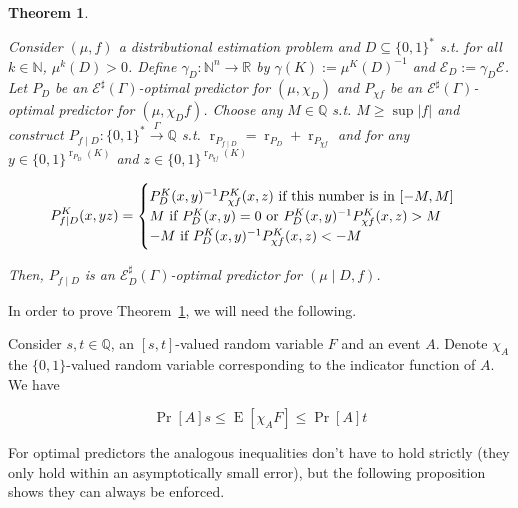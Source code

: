 \documentclass{article}
\numberwithin{equation}{section}
\theoremstyle{definition}
\theoremstyle{plain}
\newtheorem{theorem}{Theorem}[section]
\newcommand{\Bool}{\{0,1\}}
\newcommand{\Words}{{\Bool^*}}
\DeclareMathOperator{\Prb}{Pr}
\DeclareMathOperator{\E}{E}
\DeclareMathOperator{\R}{r}
\newcommand{\Nats}{\mathbb{N}}
\newcommand{\Rats}{\mathbb{Q}}
\newcommand{\Reals}{\mathbb{R}}
\newcommand{\Abs}[1]{\lvert #1 \rvert}
\newcommand{\Fall}{\mathcal{E}}
\newcommand{\ESG}{\Fall^\sharp(\Gamma)}
\newcommand{\BoolR}[1]{\Bool^{\R_{#1}(K)}}
\newcommand{\Scheme}{\xrightarrow{\Gamma}}
\begin{document}
\begin{samepage}
\begin{theorem}
\label{thm:cond}

Consider $(\mu, f)$ a distributional estimation problem and ${D \subseteq \Words}$ s.t. for all $k \in \Nats$, $\mu^k(D) > 0$. Define $\gamma_D: \Nats^n \rightarrow \Reals$ by $\gamma(K):=\mu^{K}(D)^{-1}$ and $\Fall_D:=\gamma_D \Fall$. Let $P_D$ be an $\ESG$-optimal predictor for $(\mu, \chi_D)$ and $P_{\chi f}$ be an $\ESG$-optimal predictor for $(\mu, \chi_D f)$. Choose any $M \in \Rats$ s.t. ${M \geq \sup \Abs{f}}$ and construct $P_{f \mid D}: \Words \Scheme \Rats$ s.t. $\R_{P_{f \mid D}} = \R_{P_D} + \R_{P_{\chi f}}$ and for any ${y \in \BoolR{P_D}}$ and $z \in \BoolR{P_{\chi f}}$ 

\begin{equation}
P_{f \mid D}^K(x,yz)=\begin{cases}P_D^K(x,y)^{-1} P_{\chi f}^K(x,z) \textnormal{ if this number is in } [-M,M] \\ M \textnormal{ if } P_D^K(x,y)=0 \textnormal{ or } P_D^K(x,y)^{-1} P_{\chi f}^K(x,z) > M\\ -M \textnormal{ if } P_D^K(x,y)^{-1} P_{\chi f}^K(x,z) < -M\end{cases}
\end{equation}

Then, $P_{f \mid D}$ is an $\Fall_D^\sharp(\Gamma)$-optimal predictor for $(\mu \mid D, f)$.

\end{theorem}
\end{samepage}

In order to prove Theorem~\ref{thm:cond}, we will need the following.

Consider $s,t \in \Rats$, an $[s,t]$-valued random variable $F$ and an event $A$. Denote $\chi_A$ the $\Bool$-valued random variable corresponding to the indicator function of $A$. We have 

\begin{equation}
\Prb[A]s \leq \E[\chi_A F] \leq \Prb[A]t
\end{equation}

For optimal predictors the analogous inequalities don't have to hold strictly (they only hold within an asymptotically small error), but the following proposition shows they can always be enforced.
\end{document}
